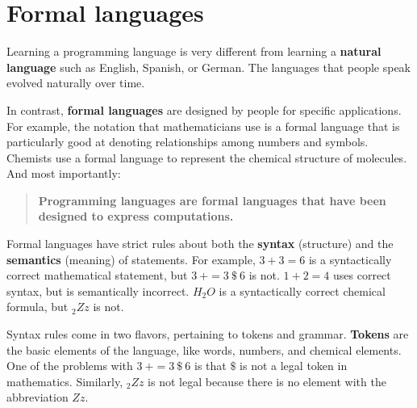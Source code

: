 \section{Formal languages}


Learning a programming language is very different from learning a {\bf natural language} such as English, Spanish, or German.
The languages that people speak evolved naturally over time.


In contrast, {\bf formal languages} are designed by people for specific applications.
For example, the notation that mathematicians use is a formal language that is particularly good at denoting relationships among numbers and symbols.
Chemists use a formal language to represent the chemical structure of molecules.
And most importantly:


\begin{quote}
{\bf Programming languages are formal languages that have been designed to express computations.}
\end{quote}


Formal languages have strict rules about both the {\bf syntax} (structure) and the {\bf semantics} (meaning) of statements.
For example, $3 + 3 = 6$ is a syntactically correct mathematical statement, but $3\ + = 3\ \$\ 6$ is not.
$1 + 2 = 4$ uses correct syntax, but is semantically incorrect.
$H_2O$ is a syntactically correct chemical formula, but $_2Zz$ is not.



Syntax rules come in two flavors, pertaining to tokens and grammar.
{\bf Tokens} are the basic elements of the language, like words, numbers, and chemical elements.
One of the problems with $3\ + = 3\ \$\ 6$ is that $\$$ is not a legal token in mathematics.
Similarly, $_2Zz$ is not legal because there is no element with the abbreviation $Zz$.

